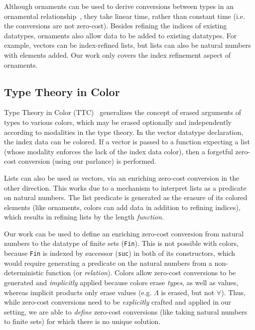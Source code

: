 \documentclass[acmsmall]{acmart}\settopmatter{}
\begin{document}
Although ornaments can be used to derive conversions between
types in an ornamental
relationship~\cite{ornaments:original,ornaments:relational},
they take linear time, rather than constant time (i.e. the conversions
are not zero-cost).
Besides refining the indices of existing datatypes, ornaments
also allow data to be added to existing datatypes. For example, vectors can
be index-refined lists, but lists can also be natural numbers with
elements added. Our work only covers the index refinement aspect of
ornaments.

\subsection{Type Theory in Color}

Type Theory in Color (TTC)~\cite{bernardy:color}
generalizes the concept of erased arguments
of types to various colors, which may be erased optionally and
independently according to modalities in the type theory. In the vector
datatype declaration, the index data can be colored. If a vector is
passed to a function expecting a list (whose modality enforces the
lack of the index data color), then a forgetful zero-cost conversion
(using our parlance) is performed.

Lists can also be used as vectors, via an enriching zero-cost
conversion in the other direction. This works due to a mechanism to
interpret lists as a predicate on natural numbers. The list predicate is
generated as the erasure of its colored elements (like ornaments,
colors can add data in addition to refining indices), which results in
refining lists by the length \textit{function}.

Our work can be used to define an enriching zero-cost conversion
from natural numbers to the datatype of
finite sets (\texttt{Fin}). This is not possible with colors, because
\texttt{Fin} is indexed by successor (\texttt{suc}) in both of its
constructors, which would require generating a predicate on the
natural numbers from a non-deterministic function (or
\textit{relation}). Colors allow zero-cost conversions to be
generated and \textit{implicitly} applied because colors erase \textit{types}, as
well as values, whereas implicit products only erase values
(e.g. $\Lambda$ is erased, but not $\forall$).
Thus, while zero-cost conversions
need to be \textit{explicitly} crafted and applied in our setting, we
are able to \textit{define} zero-cost conversions (like taking natural numbers to
finite sets) for which there is no unique solution.
\end{document}
